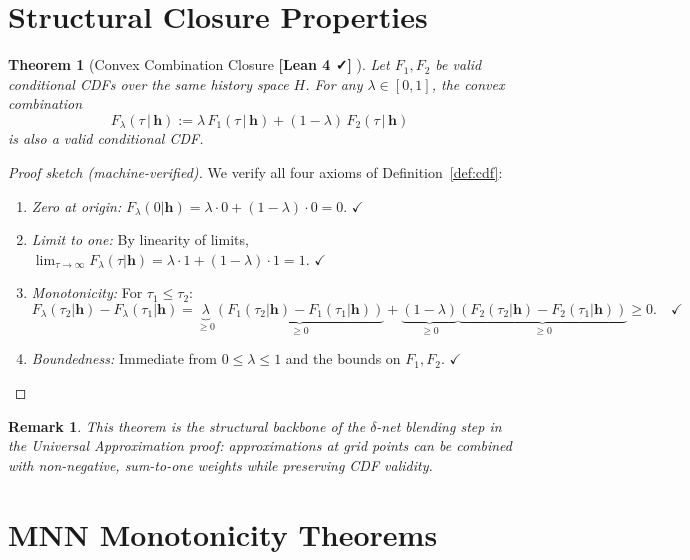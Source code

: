\documentclass[11pt]{article}
\newtheorem{theorem}{Theorem}[section]
\newtheorem{remark}{Remark}
\newcommand{\verified}{%
  \textcolor{green!60!black}{\textbf{[Lean 4 ✓]}}%
}
\newcommand{\hhat}{\boldsymbol{h}}
\begin{document}
\section{Structural Closure Properties}

\begin{theorem}[Convex Combination Closure \verified{}]
\label{thm:convex-comb}
Let $F_1, F_2$ be valid conditional CDFs over the same history space $H$.
For any $\lambda \in [0,1]$, the convex combination
\[
  F_\lambda(\tau\,|\,\hhat) := \lambda\, F_1(\tau\,|\,\hhat) + (1-\lambda)\, F_2(\tau\,|\,\hhat)
\]
is also a valid conditional CDF.
\end{theorem}

\begin{proof}[Proof sketch (machine-verified)]
We verify all four axioms of Definition~\ref{def:cdf}:
\begin{enumerate}
  \item \emph{Zero at origin:} $F_\lambda(0|\hhat) = \lambda \cdot 0 + (1-\lambda)\cdot 0 = 0$. $\checkmark$
  \item \emph{Limit to one:} By linearity of limits,
    $\lim_{\tau\to\infty} F_\lambda(\tau|\hhat) = \lambda\cdot 1 + (1-\lambda)\cdot 1 = 1$. $\checkmark$
  \item \emph{Monotonicity:} For $\tau_1 \leq \tau_2$:
    \[
      F_\lambda(\tau_2|\hhat) - F_\lambda(\tau_1|\hhat)
      = \underbrace{\lambda}_{\geq 0}\underbrace{(F_1(\tau_2|\hhat)-F_1(\tau_1|\hhat))}_{\geq 0}
      + \underbrace{(1-\lambda)}_{\geq 0}\underbrace{(F_2(\tau_2|\hhat)-F_2(\tau_1|\hhat))}_{\geq 0}
      \geq 0. \quad\checkmark
    \]
  \item \emph{Boundedness:} Immediate from $0 \leq \lambda \leq 1$ and the bounds on $F_1, F_2$. $\checkmark$
\end{enumerate}
\end{proof}

\begin{remark}
This theorem is the structural backbone of the \emph{$\delta$-net blending} step
in the Universal Approximation proof: approximations at grid points can be
combined with non-negative, sum-to-one weights while preserving CDF validity.
\end{remark}

\section{MNN Monotonicity Theorems}
\end{document}
